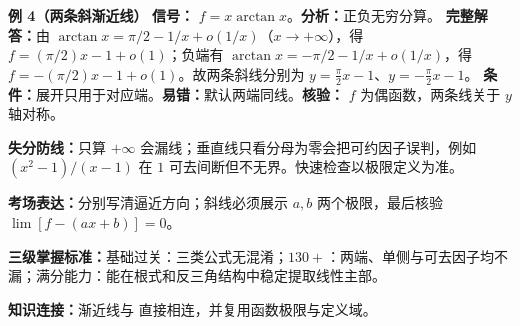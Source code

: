 \begin{knowledgeBox}
\textbf{例 4（两条斜渐近线）}\quad
\textbf{信号：} \(f=x\arctan x\)。\textbf{分析：}正负无穷分算。
\textbf{完整解答：}由 \(\arctan x=\pi/2-1/x+o(1/x)\)（\(x\to+\infty\)），得 \(f=(\pi/2)x-1+o(1)\)；负端有 \(\arctan x=-\pi/2-1/x+o(1/x)\)，得 \(f=-(\pi/2)x-1+o(1)\)。故两条斜线分别为 \(y=\frac\pi2x-1\)、\(y=-\frac\pi2x-1\)。
\textbf{条件：}展开只用于对应端。\textbf{易错：}默认两端同线。\textbf{核验：} \(f\) 为偶函数，两条线关于 \(y\) 轴对称。

\textbf{失分防线：}只算 \(+\infty\) 会漏线；垂直线只看分母为零会把可约因子误判，例如 \((x^2-1)/(x-1)\) 在 \(1\) 可去间断但不无界。快速检查以极限定义为准。

\textbf{考场表达：}分别写清逼近方向；斜线必须展示 \(a,b\) 两个极限，最后核验 \(\lim[f-(ax+b)]=0\)。

\textbf{三级掌握标准：}基础过关：三类公式无混淆；\(130+\)：两端、单侧与可去因子均不漏；满分能力：能在根式和反三角结构中稳定提取线性主部。

\textbf{知识连接：}渐近线与 直接相连，并复用函数极限与定义域。
\end{knowledgeBox}


\par

